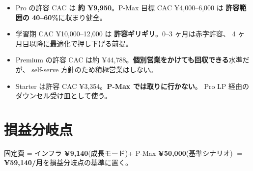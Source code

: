 \documentclass{article}
\newcommand{\hl}[1]{\textcolor{cAlert}{\textbf{#1}}}
\begin{document}
\begin{tcolorbox}[colback=green!5,colframe=green!50!black,title=\textbf{P-Max ユニット経済性の読み}]
\begin{itemize}[leftmargin=1.4em,itemsep=3pt]
  \item Pro の許容 CAC は \hl{約 ¥9,950}。P-Max 目標 CAC ¥4,000--6,000 は
        \textbf{許容範囲の 40--60\%}に収まり健全。
  \item 学習期 CAC ¥10,000--12,000 は \textbf{許容ギリギリ}。0--3 ヶ月は赤字許容、
        4 ヶ月目以降に最適化で押し下げる前提。
  \item Premium の許容 CAC は約 ¥44,788。\hl{個別営業をかけても回収できる}水準だが、
        self-serve 方針のため積極営業はしない。
  \item Starter は許容 CAC ¥3,354。\textbf{P-Max では取りに行かない}。
        Pro LP 経由のダウンセル受け皿として使う。
\end{itemize}
\end{tcolorbox}

\section{損益分岐点}

固定費 = インフラ \hl{¥9,140}(成長モード)+ P-Max \hl{¥50,000}(基準シナリオ)
$=$ \textbf{¥59,140/月}を損益分岐点の基準に置く。
\end{document}
